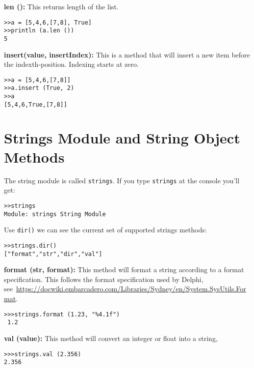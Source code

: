 \colorbox{blue!10}{\bf len ():} This returns length of the list.

\begin{lstlisting}
>>a = [5,4,6,[7,8], True]
>>println (a.len ())
5
\end{lstlisting}


\colorbox{blue!10}{\bf insert(value, insertIndex):} This is a method that will insert a new item before the indexth-position. Indexing starts at zero.
\begin{lstlisting}
>>a = [5,4,6,[7,8]]
>>a.insert (True, 2)
>>a
[5,4,6,True,[7,8]]
\end{lstlisting}


%


\section{Strings Module and String Object Methods}


The string module is called {\tt strings}. If you type {\tt strings} at the console you'll get:


\begin{lstlisting}
>>strings
Module: strings String Module
\end{lstlisting}

Use {\tt dir()} we can see the current set of supported strings methods:

\begin{lstlisting}
>>strings.dir()
["format","str","dir","val"]
\end{lstlisting}


\colorbox{blue!10}{\bf format (str, format):} This method will format a string according to a format specification. This follows the format specification used by Delphi, see~\url{https://docwiki.embarcadero.com/Libraries/Sydney/en/System.SysUtils.Format}.

\begin{lstlisting}
>>>strings.format (1.23, "%4.1f")
 1.2
\end{lstlisting}


\colorbox{blue!10}{\bf val (value):} This method will convert an integer or float into a string,
\begin{lstlisting}
>>>strings.val (2.356)
2.356
\end{lstlisting}


